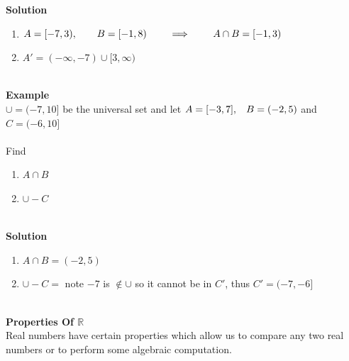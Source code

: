 \documentclass[11pt,a4paper]{article}
\begin{document}
\textbf{Solution}
\begin{enumerate}
\item $A=[-7,3),\hspace{0.7cm} B=[-1,8)\hspace{0.7cm} \implies \hspace{0.7cm} A\cap B=[-1,3)$

\item $A'=(-\infty, -7)\cup [3,\infty )$\\\\
\end{enumerate}

\textbf{Example}\\
$\cup =(-7,10]$ be the universal set and let $A=[-3,7],\hspace{0.3cm} B=(-2,5)$ and $C=(-6,10]$\\\\

Find
\begin{enumerate}
\item $A\cap B$
\item $\cup -C$\\\
\end{enumerate}

\textbf{Solution}
\begin{enumerate}
\item $A\cap B=(-2,5)$
\item $\cup - C = $ note $-7$ is $\not\in \cup$ so it cannot be in $C'$, thus $C'=(-7,-6]$\\\\
\end{enumerate}








\pagebreak
\textbf{Properties Of $\mathbb{R}$}\\
Real numbers have certain properties which allow us to compare any two real numbers or to perform some algebraic computation.
\end{document}
